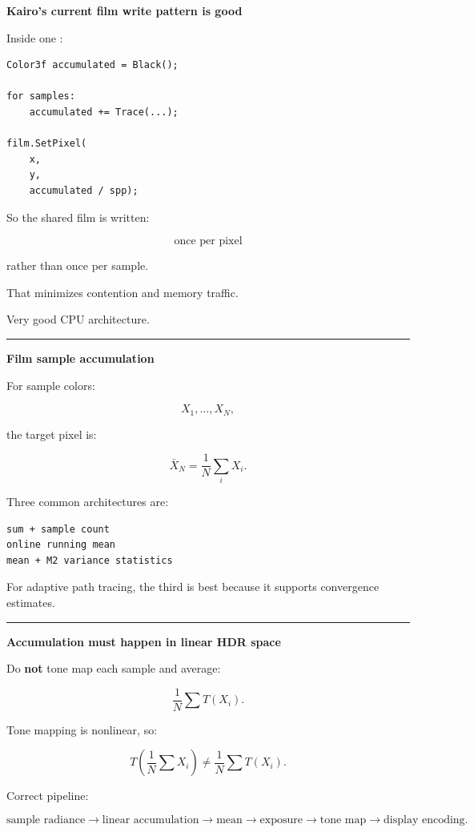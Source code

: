 \textbf{Kairo's current film write pattern is good}

Inside one :

\begin{verbatim}
Color3f accumulated = Black();

for samples:
    accumulated += Trace(...);

film.SetPixel(
    x,
    y,
    accumulated / spp);
\end{verbatim}

So the shared film is written:

\[
\boxed{\text{once per pixel}}
\]

rather than once per sample.

That minimizes contention and memory traffic.

Very good CPU architecture.

\begin{center}\rule{0.5\linewidth}{0.5pt}\end{center}

\textbf{Film sample accumulation}

For sample colors:

\[
X_1,\dots,X_N,
\]

the target pixel is:

\[
\bar X_N=
\frac1N
\sum_iX_i.
\]

Three common architectures are:

\begin{verbatim}
sum + sample count
online running mean
mean + M2 variance statistics
\end{verbatim}

For adaptive path tracing, the third is best because it supports convergence estimates.

\begin{center}\rule{0.5\linewidth}{0.5pt}\end{center}

\textbf{Accumulation must happen in linear HDR space}

Do \textbf{not} tone map each sample and average:

\[
\frac1N
\sum
T(X_i).
\]

Tone mapping is nonlinear, so:

\[
\boxed{
T\left(
\frac1N\sum X_i
\right)
\neq
\frac1N
\sum T(X_i).
}
\]

Correct pipeline:

\[
\boxed{
\text{sample radiance}
\rightarrow
\text{linear accumulation}
\rightarrow
\text{mean}
\rightarrow
\text{exposure}
\rightarrow
\text{tone map}
\rightarrow
\text{display encoding}.
}
\]

